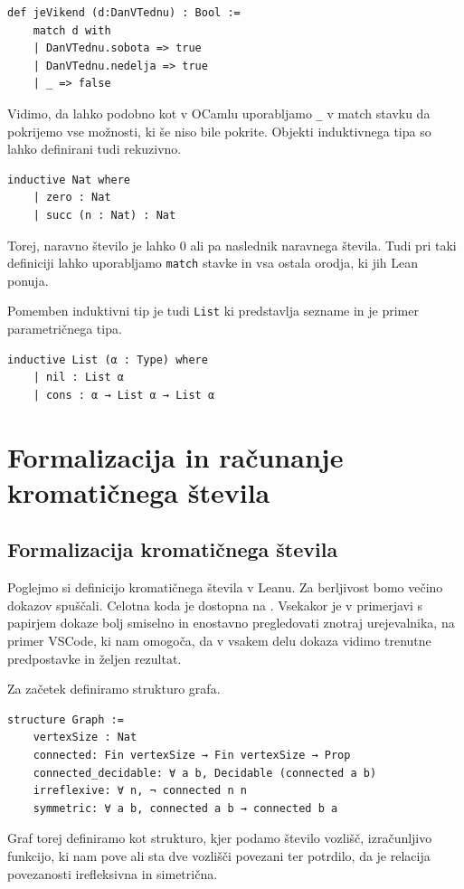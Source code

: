 \documentclass[mat1]{fmfdelo}
\begin{document}
\begin{lstlisting}
def jeVikend (d:DanVTednu) : Bool :=
    match d with
    | DanVTednu.sobota => true
    | DanVTednu.nedelja => true
    | _ => false
\end{lstlisting}

Vidimo, da lahko podobno kot v OCamlu uporabljamo \lstinline{_} v match stavku da pokrijemo vse možnosti, ki še niso bile pokrite.
Objekti induktivnega tipa so lahko definirani tudi rekuzivno.
\begin{lstlisting}
inductive Nat where
    | zero : Nat
    | succ (n : Nat) : Nat
\end{lstlisting}
Torej, naravno število je lahko 0 ali pa naslednik naravnega števila. Tudi pri taki definiciji lahko uporabljamo \lstinline{match} stavke
in vsa ostala orodja, ki jih Lean ponuja.

Pomemben induktivni tip je tudi \lstinline{List} ki predstavlja sezname in je primer parametričnega tipa.
\begin{lstlisting}
inductive List (α : Type) where
    | nil : List α
    | cons : α → List α → List α
\end{lstlisting}


\section{Formalizacija in računanje kromatičnega števila}
\subsection{Formalizacija kromatičnega števila}
Poglejmo si definicijo kromatičnega števila v Leanu.
Za berljivost bomo večino dokazov spuščali.
Celotna koda je dostopna na \cite{leanG}.
Vsekakor je v primerjavi s papirjem dokaze bolj smiselno in enostavno pregledovati znotraj urejevalnika, na primer VSCode, ki nam omogoča, da v vsakem delu dokaza vidimo 
trenutne predpostavke in željen rezultat. 

Za začetek definiramo strukturo grafa.
\begin{lstlisting}
structure Graph :=
    vertexSize : Nat
    connected: Fin vertexSize → Fin vertexSize → Prop
    connected_decidable: ∀ a b, Decidable (connected a b)
    irreflexive: ∀ n, ¬ connected n n
    symmetric: ∀ a b, connected a b → connected b a
\end{lstlisting}
Graf torej definiramo kot strukturo, kjer podamo število vozlišč, izračunljivo funkcijo, ki nam pove
ali sta dve vozlišči povezani ter potrdilo, da je relacija povezanosti irefleksivna in simetrična.
\end{document}
